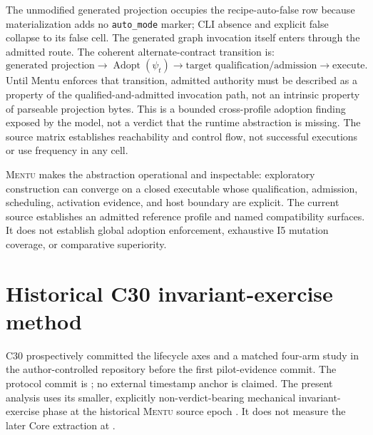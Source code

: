 \documentclass[11pt]{article}
\newcommand{\mentu}{\textsc{Mentu}}
\newcommand{\code}[1]{\texttt{#1}}
\begin{document}
The unmodified generated projection occupies the recipe-auto-false row because
materialization adds no \code{auto\_mode} marker; CLI absence and explicit
false collapse to its false cell. The generated graph invocation itself enters
through the admitted route. The coherent alternate-contract transition is:
\[
\text{generated projection}
\rightarrow
\operatorname{Adopt}(\psi_t)
\rightarrow
\text{target qualification/admission}
\rightarrow
\text{execute}.
\]
Until Mentu enforces that transition, admitted authority must be described as
a property of the qualified-and-admitted invocation path, not an intrinsic
property of parseable projection bytes. This is a bounded cross-profile
adoption finding exposed by the model, not a verdict that the runtime
abstraction is missing. The source matrix establishes reachability and control
flow, not successful executions or use frequency in any cell.

\mentu{} makes the abstraction operational and inspectable: exploratory
construction can converge on a closed executable whose qualification,
admission, scheduling, activation evidence, and host boundary are explicit.
The current source establishes an admitted reference profile and named
compatibility surfaces. It does not establish global adoption enforcement,
exhaustive I5 mutation coverage, or comparative superiority.

\section{Historical C30 invariant-exercise method}

C30 prospectively committed the lifecycle axes and a matched four-arm study in
the author-controlled repository before the first pilot-evidence commit. The
protocol commit is \code{\CThirtyPreregCommitShort}; no external timestamp
anchor is claimed. The present analysis uses its smaller,
explicitly non-verdict-bearing mechanical invariant-exercise phase at the
historical \mentu{} source epoch \code{\MentuCommitShort}. It does not measure
the later Core extraction at \code{\MentuCurrentCommitShort}.
\end{document}
